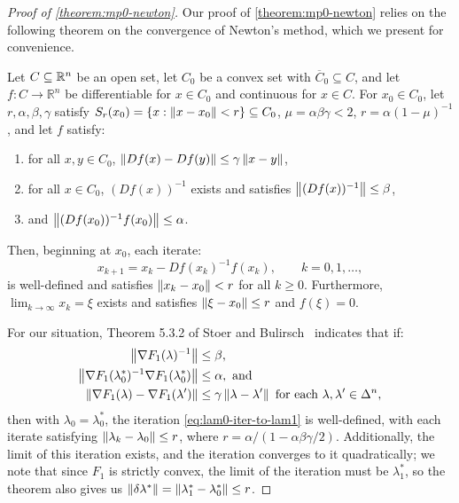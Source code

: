 \documentclass[eikonal.tex]{subfiles}
\begin{document}
\begin{proof}[Proof of \cref{theorem:mp0-newton}]
  Our proof of \cref{theorem:mp0-newton} relies on the following
  theorem on the convergence of Newton's method, which we present for
  convenience.

  \begin{theorem}\label{thm:stoer-bulirsch}
    Let $C \subseteq \mathbb{R}^n$ be an open set, let $C_0$ be a convex set
    with $\overline{C}_0 \subseteq C$, and let
    $f : C \to \mathbb{R}^n$ be differentiable for $x \in C_0$ and
    continuous for $x \in C$. For $x_0 \in C_0$, let
    $r, \alpha, \beta, \gamma$ satisfy
    $S_r(x_0) = \left\{x : \left\|x - x_0\right\| < r\right\} \subseteq C_0$,
    $\mu = \alpha\beta\gamma < 2$, $r = \alpha(1 - \mu)^{-1}$, and let
    $f$ satisfy:
    \begin{enumerate}[label=(\alph*)]
    \item for all $x, y \in C_0$,
      $\left\|D f(x) - D f(y)\right\| \leq \gamma \left\|x - y\right\|$,
    \item for all $x \in C_0$, $(D f(x))^{-1}$ exists and satisfies
      $\left\|(Df(x))^{-1}\right\| \leq \beta$,
    \item and $\left\|(Df(x_0))^{-1} f(x_0)\right\| \leq \alpha$.
    \end{enumerate}
    Then, beginning at $x_0$, each iterate:
    \begin{equation}
      x_{k+1} = x_k - Df(x_k)^{-1} f(x_k), \qquad k = 0, 1, \hdots,
    \end{equation}
    is well-defined and satisfies $\left\|x_k - x_0\right\| < r$ for all
    $k \geq 0$. Furthermore, $\lim_{k \to \infty} x_k = \xi$ exists and
    satisfies $\left\|\xi - x_0\right\| \leq r$ and $f(\xi) = 0$.
  \end{theorem}

  For our situation, Theorem 5.3.2 of Stoer and
  Bulirsch~\cite{stoer2013introduction} indicates that if:
  \begin{align}
    \norm{\nabla F_1(\lambda)^{-1}} &\leq \beta,\label{item:sb-newton-1} \\
    \norm{\nabla F_1(\lambda_0^*)^{-1} \nabla F_1(\lambda_0^*)} &\leq \alpha,\label{item:sb-newton-2} \mbox{ and} \\
    \norm{\nabla F_1(\lambda) - \nabla F_1(\lambda')} &\leq \gamma \norm{\lambda - \lambda'} \mbox{ for each } \lambda, \lambda' \in \Delta^n,\label{item:sb-newton-3}
  \end{align}
  then with $\lambda_0 = \lambda_0^*$, the iteration
  \cref{eq:lam0-iter-to-lam1} is well-defined, with each iterate
  satisfying $\left\|\lambda_k - \lambda_0\right\| \leq r$, where
  $r = \alpha/(1 - \alpha\beta\gamma/2)$. Additionally, the limit of
  this iteration exists, and the iteration converges to it
  quadratically; we note that since $F_1$ is strictly convex, the
  limit of the iteration must be $\lambda_1^*$, so the theorem also
  gives us
  $\left\|\delta\lambda^*\right\| = \left\|\lambda_1^* - \lambda_0^*\right\| \leq r$.


\end{proof}
\end{document}
